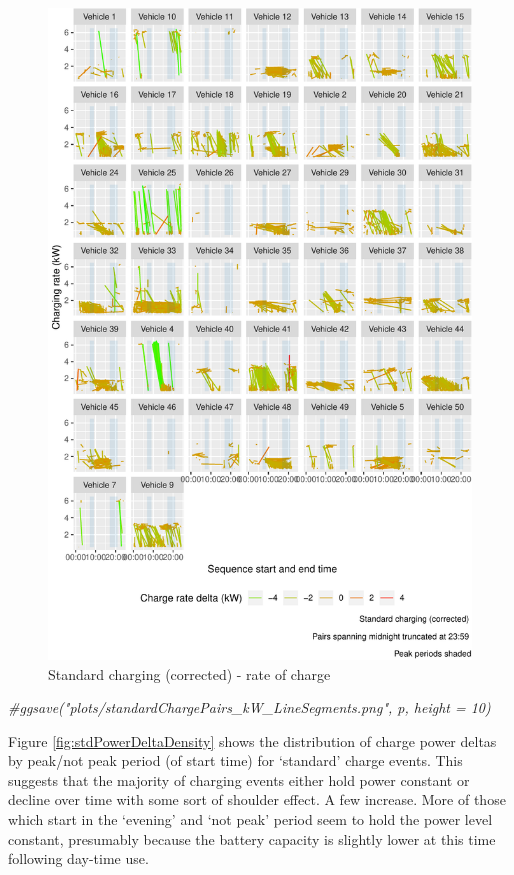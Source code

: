 \documentclass[]{article}
\newenvironment{Shaded}{\begin{snugshade}}{\end{snugshade}}
\newcommand{\CommentTok}[1]{\textcolor[rgb]{0.56,0.35,0.01}{\textit{#1}}}
\begin{document}
\begin{figure}
\centering
\includegraphics{EVBB_report_v1_files/figure-latex/checkStdSequenceskW-1.pdf}
\caption{\label{fig:checkStdSequenceskW}Standard charging (corrected) - rate of charge}
\end{figure}

\begin{Shaded}
\begin{Highlighting}[]
\CommentTok{#ggsave("plots/standardChargePairs_kW_LineSegments.png", p, height = 10)}
\end{Highlighting}
\end{Shaded}

Figure \ref{fig:stdPowerDeltaDensity} shows the distribution of charge power deltas by peak/not peak period (of start time) for `standard' charge events. This suggests that the majority of charging events either hold power constant or decline over time with some sort of shoulder effect. A few increase. More of those which start in the `evening' and `not peak' period seem to hold the power level constant, presumably because the battery capacity is slightly lower at this time following day-time use.
\end{document}
